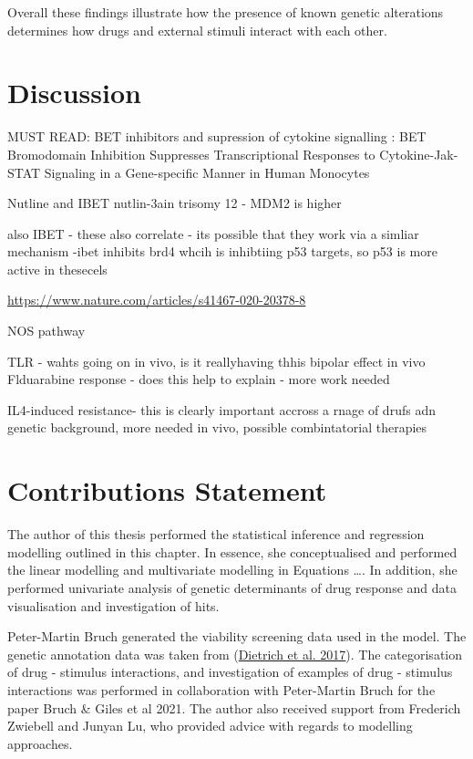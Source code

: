 \documentclass[11pt, a4paper, twosided]{book}
\begin{document}
Overall these findings illustrate how the presence of known genetic alterations determines how drugs and external stimuli interact with each other.

\hypertarget{discussion-2}{%
\section{Discussion}\label{discussion-2}}

MUST READ: BET inhibitors and supression of cytokine signalling : BET Bromodomain Inhibition Suppresses Transcriptional Responses to Cytokine-Jak-STAT Signaling in a Gene-specific Manner in Human Monocytes

Nutline and IBET
nutlin-3ain trisomy 12 - MDM2 is higher

also IBET -
these also correlate - its possible that they work via a simliar mechanism -ibet inhibits brd4 whcih is inhibtiing p53 targets, so p53 is more active in thesecels

\url{https://www.nature.com/articles/s41467-020-20378-8}

NOS pathway

TLR - wahts going on in vivo, is it reallyhaving thhis bipolar effect in vivo
Flduarabine response - does this help to explain - more work needed

IL4-induced resistance- this is clearly important accross a rnage of drufs adn genetic background, more needed in vivo, possible combintatorial therapies

\hypertarget{contributions-statement-2}{%
\section{Contributions Statement}\label{contributions-statement-2}}

The author of this thesis performed the statistical inference and regression modelling outlined in this chapter. In essence, she conceptualised and performed the linear modelling and multivariate modelling in Equations \ldots. In addition, she performed univariate analysis of genetic determinants of drug response and data visualisation and investigation of hits.

Peter-Martin Bruch generated the viability screening data used in the model. The genetic annotation data was taken from (\protect\hyperlink{ref-JCIpaper}{Dietrich et al. 2017}). The categorisation of drug - stimulus interactions, and investigation of examples of drug - stimulus interactions was performed in collaboration with Peter-Martin Bruch for the paper Bruch \& Giles et al 2021. The author also received support from Frederich Zwiebell and Junyan Lu, who provided advice with regards to modelling approaches.
\end{document}
